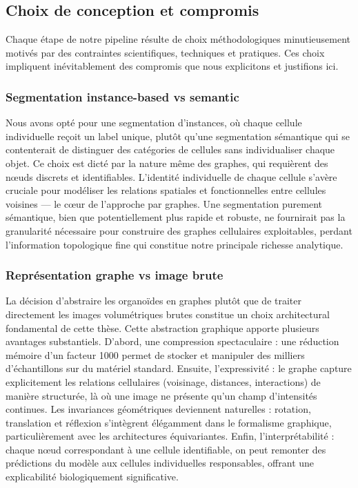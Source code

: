 \subsection{Choix de conception et compromis}

Chaque étape de notre pipeline résulte de choix méthodologiques minutieusement motivés par des contraintes scientifiques, techniques et pratiques. Ces choix impliquent inévitablement des compromis que nous explicitons et justifions ici.

\subsubsection{Segmentation instance-based vs semantic}

Nous avons opté pour une segmentation d'instances, où chaque cellule individuelle reçoit un label unique, plutôt qu'une segmentation sémantique qui se contenterait de distinguer des catégories de cellules sans individualiser chaque objet. Ce choix est dicté par la nature même des graphes, qui requièrent des nœuds discrets et identifiables. L'identité individuelle de chaque cellule s'avère cruciale pour modéliser les relations spatiales et fonctionnelles entre cellules voisines — le cœur de l'approche par graphes. Une segmentation purement sémantique, bien que potentiellement plus rapide et robuste, ne fournirait pas la granularité nécessaire pour construire des graphes cellulaires exploitables, perdant l'information topologique fine qui constitue notre principale richesse analytique.

\subsubsection{Représentation graphe vs image brute}

La décision d'abstraire les organoïdes en graphes plutôt que de traiter directement les images volumétriques brutes constitue un choix architectural fondamental de cette thèse. Cette abstraction graphique apporte plusieurs avantages substantiels. D'abord, une compression spectaculaire : une réduction mémoire d'un facteur 1000 permet de stocker et manipuler des milliers d'échantillons sur du matériel standard. Ensuite, l'expressivité : le graphe capture explicitement les relations cellulaires (voisinage, distances, interactions) de manière structurée, là où une image ne présente qu'un champ d'intensités continues. Les invariances géométriques deviennent naturelles : rotation, translation et réflexion s'intègrent élégamment dans le formalisme graphique, particulièrement avec les architectures équivariantes. Enfin, l'interprétabilité : chaque nœud correspondant à une cellule identifiable, on peut remonter des prédictions du modèle aux cellules individuelles responsables, offrant une explicabilité biologiquement significative.

